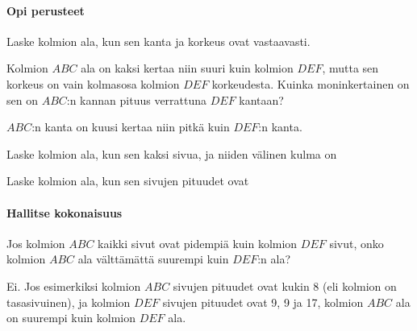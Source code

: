 \begin{tehtavasivu}

\paragraph*{Opi perusteet}

\begin{tehtava}
Laske kolmion ala, kun sen kanta ja korkeus ovat
vastaavasti.
\begin{vastaus}
\end{vastaus}
\end{tehtava}

\begin{tehtava}
Kolmion $ABC$ ala on kaksi kertaa niin suuri kuin kolmion $DEF$, mutta sen korkeus on vain kolmasosa kolmion $DEF$ korkeudesta. Kuinka moninkertainen on sen on $ABC$:n kannan pituus verrattuna $DEF$ kantaan?
\begin{vastaus}
$ABC$:n kanta on kuusi kertaa niin pitkä kuin $DEF$:n kanta.
\end{vastaus}
\end{tehtava}


\begin{tehtava}
Laske kolmion ala, kun sen kaksi sivua, ja niiden välinen kulma on
\begin{vastaus}
\end{vastaus}
\end{tehtava}

\begin{tehtava}
Laske kolmion ala, kun sen sivujen pituudet ovat
\begin{vastaus}
\end{vastaus}
\end{tehtava}

\paragraph*{Hallitse kokonaisuus}

\begin{tehtava}
Jos kolmion $ABC$ kaikki sivut ovat pidempiä kuin kolmion $DEF$ sivut, onko kolmion $ABC$ ala välttämättä suurempi kuin $DEF$:n ala?
\begin{vastaus}
Ei. Jos esimerkiksi kolmion $ABC$ sivujen pituudet ovat kukin 8 (eli kolmion on tasasivuinen), ja kolmion $DEF$ sivujen pituudet ovat 9, 9 ja 17, kolmion $ABC$ ala on suurempi kuin kolmion $DEF$ ala.
\end{vastaus}
\end{tehtava}


\end{tehtavasivu}
